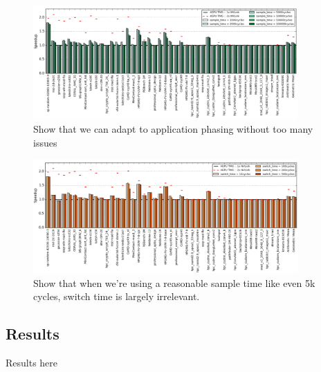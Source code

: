\begin{figure}[tp]
    \centering
    \includegraphics[width=0.9\textwidth]{figures/sample-time.jpg}
    \caption{Show that we can adapt to application phasing without too many issues}
    \label{fig:sampletime}
\end{figure}


\begin{figure}[tp]
    \centering
    \includegraphics[width=0.9\textwidth]{figures/switch-time.jpg}
    \caption{Show that when we're using a reasonable sample time like even 5k cycles, switch time is largely irrelevant.}
    \label{fig:switchtime}
\end{figure}

\subsection{Results}
Results here